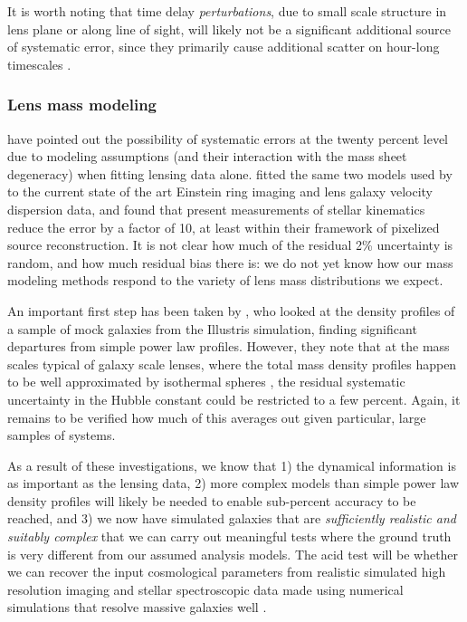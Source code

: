 It is worth noting that time delay {\it perturbations},  due to small
scale structure in lens plane or along line of sight, will likely not be
a significant  additional source of systematic error, since they
primarily cause additional scatter on hour-long timescales
\citep{K+M09}.


\subsubsection{Lens mass modeling}

\citet{S+S13} have pointed out the possibility of systematic errors at
the twenty percent level due to modeling assumptions (and their
interaction with the mass sheet degeneracy) when fitting lensing data
alone. \citet{Suy++14} fitted the same two models used by
\citet{S+S13}  to the current state of the art Einstein ring imaging and
lens galaxy velocity dispersion data, and found that present
measurements of stellar kinematics reduce the error by a factor of
10, at least within their framework of pixelized source
reconstruction.  It is not clear how much of the residual 2\%
uncertainty is random, and how much residual bias there is: we do not
yet know how our mass modeling methods respond to the variety of lens
mass distributions we expect.

An important first step has been taken by \citet{XuEtal2016}, who
looked at the density profiles of a sample of mock galaxies from the
Illustris simulation, finding significant departures from simple power
law profiles. However, they note that at the mass scales typical of
galaxy scale lenses, where the total mass density profiles happen to
be well approximated by isothermal spheres
\citep{Koo++09,Aug++10}, the residual systematic uncertainty
in the Hubble constant could be restricted to a few percent.
Again, it remains to be verified how much of this averages out
given particular, large samples of systems.

As a result of these investigations, we know that 1) the dynamical
information is as important as the lensing data, 2) more complex
models than simple power law density profiles will likely be needed to
enable sub-percent accuracy to be reached, and 3) we now have
simulated galaxies that are {\it sufficiently realistic and suitably
complex} that we can carry out meaningful tests where the ground truth
is very different from our assumed analysis models. The acid test will
be whether we can recover the input cosmological parameters from
realistic simulated high resolution imaging and stellar spectroscopic
data made using numerical simulations that resolve massive
galaxies well \citep[e.g.,][]{Fia++16}.

